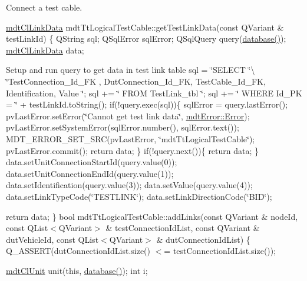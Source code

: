 Connect a test cable. 

\hyperlink{classmdt_cl_link_data}{mdt\-Cl\-Link\-Data} mdt\-Tt\-Logical\-Test\-Cable\-::get\-Test\-Link\-Data(const Q\-Variant \& test\-Link\-Id) \{ Q\-String sql; Q\-Sql\-Error sql\-Error; Q\-Sql\-Query query(\hyperlink{classmdt_tt_base_a82c3f795b6cb8101b12e0e0ef340c1be}{database()}); \hyperlink{classmdt_cl_link_data}{mdt\-Cl\-Link\-Data} data;

Setup and run query to get data in test link table sql = \char`\"{}\-S\-E\-L\-E\-C\-T \char`\"{}\textbackslash{} \char`\"{}\-Test\-Connection\-\_\-\-Id\-\_\-\-F\-K , Dut\-Connection\-\_\-\-Id\-\_\-\-F\-K, Test\-Cable\-\_\-\-Id\-\_\-\-F\-K, Identification, Value \char`\"{}; sql += \char`\"{} F\-R\-O\-M Test\-Link\-\_\-tbl \char`\"{}; sql += \char`\"{} W\-H\-E\-R\-E Id\-\_\-\-P\-K = \char`\"{} + test\-Link\-Id.\-to\-String(); if(!query.exec(sql))\{ sql\-Error = query.\-last\-Error(); pv\-Last\-Error.\-set\-Error(\char`\"{}\-Cannot get test link data\char`\"{}, \hyperlink{classmdt_error_a5c8b1a040e2feaa848f6201d6b6f0cd7a35f5c05a7d15b6433445cdbffa6d5260}{mdt\-Error\-::\-Error}); pv\-Last\-Error.\-set\-System\-Error(sql\-Error.\-number(), sql\-Error.\-text()); M\-D\-T\-\_\-\-E\-R\-R\-O\-R\-\_\-\-S\-E\-T\-\_\-\-S\-R\-C(pv\-Last\-Error, \char`\"{}mdt\-Tt\-Logical\-Test\-Cable\char`\"{}); pv\-Last\-Error.\-commit(); return data; \} if(!query.next())\{ return data; \} data.\-set\-Unit\-Connection\-Start\-Id(query.\-value(0)); data.\-set\-Unit\-Connection\-End\-Id(query.\-value(1)); data.\-set\-Identification(query.\-value(3)); data.\-set\-Value(query.\-value(4)); data.\-set\-Link\-Type\-Code(\char`\"{}\-T\-E\-S\-T\-L\-I\-N\-K\char`\"{}); data.\-set\-Link\-Direction\-Code(\char`\"{}\-B\-I\-D\char`\"{});

return data; \} bool mdt\-Tt\-Logical\-Test\-Cable\-::add\-Links(const Q\-Variant \& node\-Id, const Q\-List$<$\-Q\-Variant$>$ \& test\-Connection\-Id\-List, const Q\-Variant \& dut\-Vehicle\-Id, const Q\-List$<$\-Q\-Variant$>$ \& dut\-Connection\-Id\-List) \{ Q\-\_\-\-A\-S\-S\-E\-R\-T(dut\-Connection\-Id\-List.\-size() $<$= test\-Connection\-Id\-List.\-size());

\hyperlink{classmdt_cl_unit}{mdt\-Cl\-Unit} unit(this, \hyperlink{classmdt_tt_base_a82c3f795b6cb8101b12e0e0ef340c1be}{database()}); int i;

